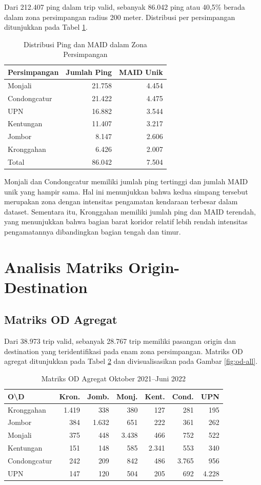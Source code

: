 Dari 212.407 ping dalam trip valid, sebanyak 86.042 ping atau 40,5\% berada dalam zona persimpangan radius 200 meter. Distribusi per persimpangan ditunjukkan pada Tabel \ref{tab:zona}.

\begin{table}[htbp]
\centering
\caption{Distribusi Ping dan MAID dalam Zona Persimpangan}
\label{tab:zona}
\begin{tabular}{lrr}
\hline
Persimpangan & Jumlah Ping & MAID Unik\\
\hline
Monjali & 21.758 & 4.454\\
Condongcatur & 21.422 & 4.475\\
UPN & 16.882 & 3.544\\
Kentungan & 11.407 & 3.217\\
Jombor & 8.147 & 2.606\\
Kronggahan & 6.426 & 2.007\\
\hline
Total & 86.042 & 7.504\\
\hline
\end{tabular}
\end{table}

Monjali dan Condongcatur memiliki jumlah ping tertinggi dan jumlah MAID unik yang hampir sama. Hal ini menunjukkan bahwa kedua simpang tersebut merupakan zona dengan intensitas pengamatan kendaraan terbesar dalam dataset. Sementara itu, Kronggahan memiliki jumlah ping dan MAID terendah, yang menunjukkan bahwa bagian barat koridor relatif lebih rendah intensitas pengamatannya dibandingkan bagian tengah dan timur.

\section{Analisis Matriks Origin-Destination}

\subsection{Matriks OD Agregat}

Dari 38.973 trip valid, sebanyak 28.767 trip memiliki pasangan origin dan destination yang teridentifikasi pada enam zona persimpangan. Matriks OD agregat ditunjukkan pada Tabel \ref{tab:od} dan divisualisasikan pada Gambar \ref{fig:od-all}.

\begin{table}[htbp]
\centering
\caption{Matriks OD Agregat Oktober 2021--Juni 2022}
\label{tab:od}
\small
\begin{tabular}{lrrrrrr}
\hline
O\textbackslash D & Kron. & Jomb. & Monj. & Kent. & Cond. & UPN\\
\hline
Kronggahan & 1.419 & 338 & 380 & 127 & 281 & 195\\
Jombor & 384 & 1.632 & 651 & 222 & 361 & 262\\
Monjali & 375 & 448 & 3.438 & 466 & 752 & 522\\
Kentungan & 151 & 148 & 585 & 2.341 & 553 & 340\\
Condongcatur & 242 & 209 & 842 & 486 & 3.765 & 956\\
UPN & 147 & 120 & 504 & 205 & 692 & 4.228\\
\hline
\end{tabular}
\end{table}

